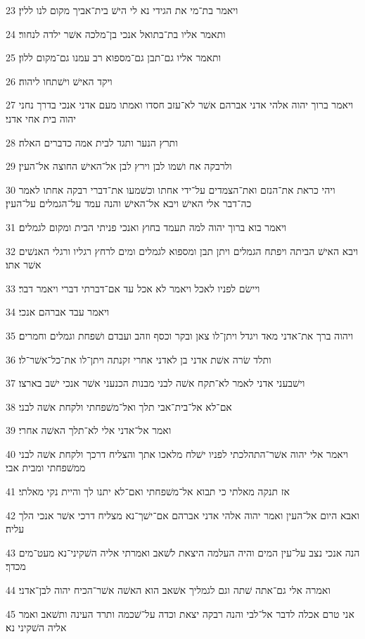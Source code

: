 \par 23 ויאמר בת־מי את הגידי נא לי הישׁ בית־אביך מקום לנו ללין׃
\par 24 ותאמר אליו בת־בתואל אנכי בן־מלכה אשׁר ילדה לנחור׃
\par 25 ותאמר אליו גם־תבן גם־מספוא רב עמנו גם־מקום ללון׃
\par 26 ויקד האישׁ וישׁתחו ליהוה׃
\par 27 ויאמר ברוך יהוה אלהי אדני אברהם אשׁר לא־עזב חסדו ואמתו מעם אדני אנכי בדרך נחני יהוה בית אחי אדני׃
\par 28 ותרץ הנער ותגד לבית אמה כדברים האלה׃
\par 29 ולרבקה אח ושׁמו לבן וירץ לבן אל־האישׁ החוצה אל־העין׃
\par 30 ויהי כראת את־הנזם ואת־הצמדים על־ידי אחתו וכשׁמעו את־דברי רבקה אחתו לאמר כה־דבר אלי האישׁ ויבא אל־האישׁ והנה עמד על־הגמלים על־העין׃
\par 31 ויאמר בוא ברוך יהוה למה תעמד בחוץ ואנכי פניתי הבית ומקום לגמלים׃
\par 32 ויבא האישׁ הביתה ויפתח הגמלים ויתן תבן ומספוא לגמלים ומים לרחץ רגליו ורגלי האנשׁים אשׁר אתו׃
\par 33 ויישׂם לפניו לאכל ויאמר לא אכל עד אם־דברתי דברי ויאמר דבר׃
\par 34 ויאמר עבד אברהם אנכי׃
\par 35 ויהוה ברך את־אדני מאד ויגדל ויתן־לו צאן ובקר וכסף וזהב ועבדם ושׁפחת וגמלים וחמרים׃
\par 36 ותלד שׂרה אשׁת אדני בן לאדני אחרי זקנתה ויתן־לו את־כל־אשׁר־לו׃
\par 37 וישׁבעני אדני לאמר לא־תקח אשׁה לבני מבנות הכנעני אשׁר אנכי ישׁב בארצו׃
\par 38 אם־לא אל־בית־אבי תלך ואל־משׁפחתי ולקחת אשׁה לבני׃
\par 39 ואמר אל־אדני אלי לא־תלך האשׁה אחרי׃
\par 40 ויאמר אלי יהוה אשׁר־התהלכתי לפניו ישׁלח מלאכו אתך והצליח דרכך ולקחת אשׁה לבני ממשׁפחתי ומבית אבי׃
\par 41 אז תנקה מאלתי כי תבוא אל־משׁפחתי ואם־לא יתנו לך והיית נקי מאלתי׃
\par 42 ואבא היום אל־העין ואמר יהוה אלהי אדני אברהם אם־ישׁך־נא מצליח דרכי אשׁר אנכי הלך עליה׃
\par 43 הנה אנכי נצב על־עין המים והיה העלמה היצאת לשׁאב ואמרתי אליה השׁקיני־נא מעט־מים מכדך׃
\par 44 ואמרה אלי גם־אתה שׁתה וגם לגמליך אשׁאב הוא האשׁה אשׁר־הכיח יהוה לבן־אדני׃
\par 45 אני טרם אכלה לדבר אל־לבי והנה רבקה יצאת וכדה על־שׁכמה ותרד העינה ותשׁאב ואמר אליה השׁקיני נא׃
